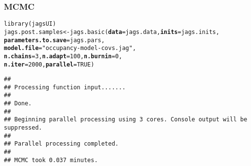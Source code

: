 \documentclass[color=usenames,dvipsnames]{beamer}\usepackage[]{graphicx}\usepackage[]{xcolor}
\makeatletter
\newcommand{\hlnum}[1]{\textcolor[rgb]{0.69,0.494,0}{#1}}%
\newcommand{\hlsng}[1]{\textcolor[rgb]{0.749,0.012,0.012}{#1}}%
\newcommand{\hldef}[1]{\textcolor[rgb]{0,0,0}{#1}}%
\newcommand{\hlkwb}[1]{\textcolor[rgb]{0,0.341,0.682}{#1}}%
\newcommand{\hlkwc}[1]{\textcolor[rgb]{0,0,0}{\textbf{#1}}}%
\newcommand{\hlkwd}[1]{\textcolor[rgb]{0.004,0.004,0.506}{#1}}%
\newenvironment{kframe}{%
 \def\at@end@of@kframe{}%
 \ifinner\ifhmode%
  \def\at@end@of@kframe{\end{minipage}}%
  \begin{minipage}{\columnwidth}%
 \fi\fi%
 \def\FrameCommand##1{\hskip\@totalleftmargin \hskip-\fboxsep
 \colorbox{shadecolor}{##1}\hskip-\fboxsep
     \hskip-\linewidth \hskip-\@totalleftmargin \hskip\columnwidth}%
 \MakeFramed {\advance\hsize-\width
   \@totalleftmargin\z@ \linewidth\hsize
   \@setminipage}}%
 {\par\unskip\endMakeFramed%
 \at@end@of@kframe}
\newenvironment{knitrout}{}{} %
\makeatother
\begin{document}
\begin{frame}[fragile]
  \frametitle{MCMC}
  \small
\begin{knitrout}\scriptsize
{}\color{fgcolor}\begin{kframe}
\begin{alltt}
\hlkwd{library}\hldef{(jagsUI)}
\hldef{jags.post.samples} \hlkwb{<-} \hlkwd{jags.basic}\hldef{(}\hlkwc{data}\hldef{=jags.data,} \hlkwc{inits}\hldef{=jags.inits,}
                                \hlkwc{parameters.to.save}\hldef{=jags.pars,}
                                \hlkwc{model.file}\hldef{=}\hlsng{"occupancy-model-covs.jag"}\hldef{,}
                                \hlkwc{n.chains}\hldef{=}\hlnum{3}\hldef{,} \hlkwc{n.adapt}\hldef{=}\hlnum{100}\hldef{,} \hlkwc{n.burnin}\hldef{=}\hlnum{0}\hldef{,}
                                \hlkwc{n.iter}\hldef{=}\hlnum{2000}\hldef{,} \hlkwc{parallel}\hldef{=}\hlnum{TRUE}\hldef{)}
\end{alltt}
\begin{verbatim}
## 
## Processing function input....... 
## 
## Done. 
##  
## Beginning parallel processing using 3 cores. Console output will be suppressed.
## 
## Parallel processing completed.
## 
## MCMC took 0.037 minutes.
\end{verbatim}
\end{kframe}
\end{knitrout}
\end{frame}
\end{document}
